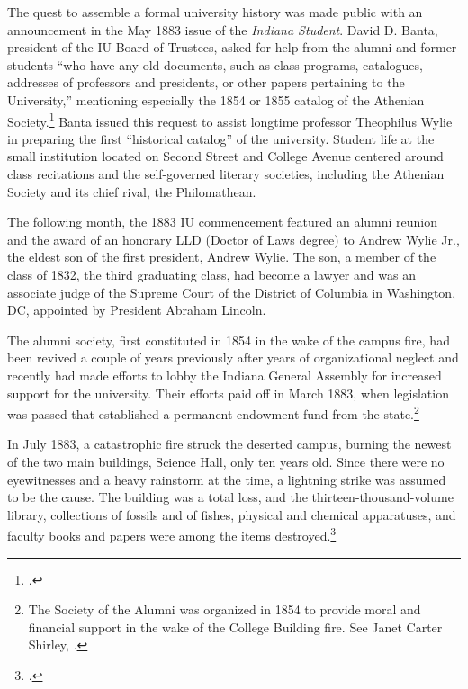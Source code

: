 \documentclass[
  american,
  letterpaper,
]{scrreprt}
\begin{document}
The quest to assemble a formal university history was made public with
an announcement in the May 1883 issue of the \emph{Indiana Student}.
David D. Banta, president of the IU Board of Trustees, asked for help
from the alumni and former students ``who have any old documents, such
as class programs, catalogues, addresses of professors and presidents,
or other papers pertaining to the University,'' mentioning especially
the 1854 or 1855 catalog of the Athenian Society.\footnote{.} Banta issued this request to
assist longtime professor Theophilus Wylie in preparing the first
``historical catalog'' of the university. Student life at the small
institution located on Second Street and College Avenue centered around
class recitations and the self-governed literary societies, including
the Athenian Society and its chief rival, the Philomathean.

The following month, the 1883 IU commencement featured an alumni reunion
and the award of an honorary LLD (Doctor of Laws degree) to Andrew Wylie
Jr., the eldest son of the first president, Andrew Wylie. The son, a
member of the class of 1832, the third graduating class, had become a
lawyer and was an associate judge of the Supreme Court of the District
of Columbia in Washington, DC, appointed by President Abraham Lincoln.

The alumni society, first constituted in 1854 in the wake of the campus
fire, had been revived a couple of years previously after years of
organizational neglect and recently had made efforts to lobby the
Indiana General Assembly for increased support for the university. Their
efforts paid off in March 1883, when legislation was passed that
established a permanent endowment fund from the state.\footnote{The
  Society of the Alumni was organized in 1854 to provide moral and
  financial support in the wake of the College Building fire. See Janet
  Carter Shirley, .}

In July 1883, a catastrophic fire struck the deserted campus, burning
the newest of the two main buildings, Science Hall, only ten years old.
Since there were no eyewitnesses and a heavy rainstorm at the time, a
lightning strike was assumed to be the cause. The building was a total
loss, and the thirteen-thousand-volume library, collections of fossils
and of fishes, physical and chemical apparatuses, and faculty books and
papers were among the items destroyed.\footnote{.}
\end{document}
